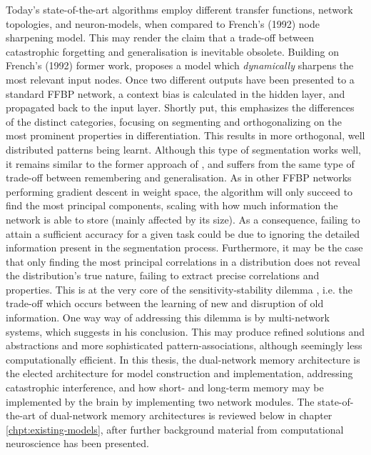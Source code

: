 Today's state-of-the-art algorithms employ different transfer functions, network topologies, and neuron-models, when compared to French's (1992) node sharpening model. This may render the claim that a trade-off between catastrophic forgetting and generalisation is inevitable obsolete.
Building on French's (1992) former work, \cite{French1994} proposes a model which \textit{dynamically} sharpens the most relevant input nodes. Once two different outputs have been presented to a standard FFBP network, a context bias is calculated in the hidden layer, and propagated back to the input layer. Shortly put, this emphasizes the differences of the distinct categories, focusing on segmenting and orthogonalizing on the most prominent properties in differentiation. This results in more orthogonal, well distributed patterns being learnt.
Although this type of segmentation works well, it remains similar to the former approach of \cite{French1992}, and suffers from the same type of trade-off between remembering and generalisation. As in other FFBP networks performing gradient descent in weight space, the algorithm will only succeed to find the most principal components, scaling with how much information the network is able to store (mainly affected by its size). As a consequence, failing to attain a sufficient accuracy for a given task could be due to ignoring the detailed information present in the segmentation process. Furthermore, it may be the case that only finding the most principal correlations in a distribution does not reveal the distribution's true nature, failing to extract precise correlations and properties. This is at the very core of the sensitivity-stability dilemma \citep{Hebb1949}, i.e. the trade-off which occurs between the learning of new and disruption of old information. One way way of addressing this dilemma is by multi-network systems, which \cite{French1994} suggests in his conclusion. This may produce refined solutions and abstractions and more sophisticated pattern-associations, although seemingly less computationally efficient. In this thesis, the dual-network memory architecture \citep{McClelland1995} is the elected architecture for model construction and implementation, addressing catastrophic interference, and how short- and long-term memory may be implemented by the brain by implementing two network modules. The state-of-the-art of dual-network memory architectures is reviewed below in chapter \ref{chpt:existing-models}, after further background material from computational neuroscience has been presented.


